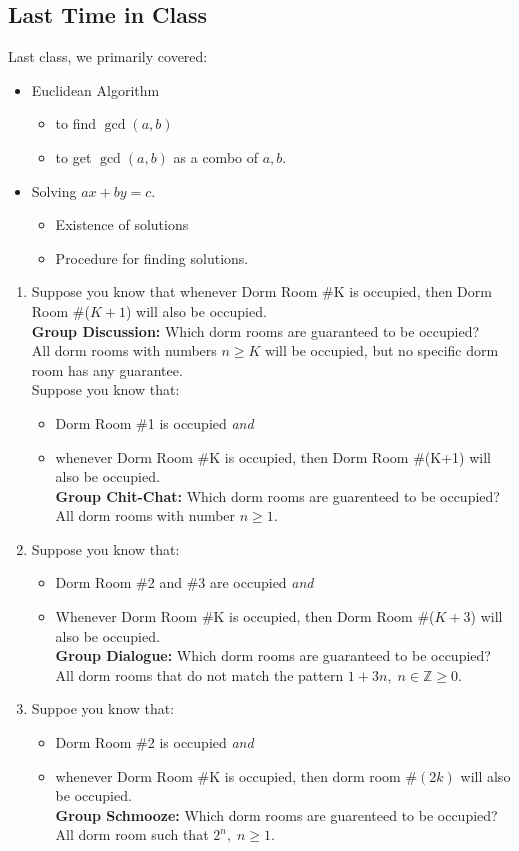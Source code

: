 \documentclass[10pt,oneside]{book}
\newcommand{\Z}{\mathbb{Z}}\newcommand{\R}{\mathbb{R}}\newcommand{\N}{\mathbb{N}}
\newcommand{\gspc}{\vspace{0.13cm}} %
\newcommand{\gline}{\gspc\\} %
\begin{document}
\newcommand{\cg}[1]{\color{OliveGreen}#1\color{black}}
\newcommand{\cb}[1]{\color{BlueViolet}#1\color{black}}
%
%
\subsection*{Last Time in Class}
Last class, we primarily covered:
\begin{itemize}[itemsep=0pt, parsep=0pt]
	\item Euclidean Algorithm
	\begin{itemize}
		\item to find $\gcd(a,b)$
		\item to get $\gcd(a,b)$ as a combo of $a,b$. 
	\end{itemize}
	\item Solving $ax + by = c$. 
  \begin{itemize}
    \item Existence of solutions
    \item Procedure for finding solutions.
  \end{itemize}
\end{itemize}
\begin{enumerate}
  \item Suppose you know that whenever Dorm Room \#K is occupied, then Dorm Room \#($K+1$) will also be occupied.\\
  \textbf{Group Discussion: }Which dorm rooms are guaranteed to be occupied?\gline
  All dorm rooms with numbers $n\ge K$ will be occupied, but no specific dorm room has any guarantee.\gline
  Suppose you know that:
  \begin{itemize}
    \item Dorm Room \#1 is occupied \textit{and}
    \item whenever Dorm Room \#K is occupied, then Dorm Room \#(K+1) will also be occupied. \\
    \textbf{Group Chit-Chat: }Which dorm rooms are guarenteed to be occupied?\gline
    All dorm rooms with number $n \ge 1$.
  \end{itemize}
  \item Suppose you know that:
  \begin{itemize}
    \item Dorm Room \#2 and \#3 are occupied \textit{and}
    \item Whenever Dorm Room \#K is occupied, then Dorm Room \#($K+3$) will also be occupied.\gline
    \textbf{Group Dialogue:} Which dorm rooms are guaranteed to be occupied?\gline
    All dorm rooms that do not match the pattern $1 + 3n, \;n\in\Z \ge 0$.  
  \end{itemize}
  \item Suppoe you know that:
  \begin{itemize}
    \item Dorm Room \#2 is occupied \textit{and}
    \item whenever Dorm Room \#K is occupied, then dorm room $\#(2k)$ will also be occupied. \gline
    \textbf{Group Schmooze:} Which dorm rooms are guarenteed to be occupied?\gline
    All dorm room such that $2^n,\; n\ge 1$. 
  \end{itemize}
\end{enumerate}
\end{document}
